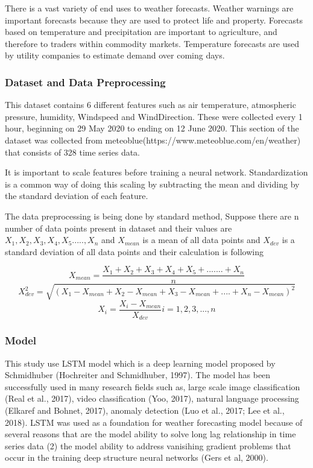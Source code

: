 There is a vast variety of end uses to weather forecasts. Weather warnings are important forecasts because they are used to protect life and property. Forecasts based on temperature and precipitation are important to agriculture, and therefore to traders within commodity markets. Temperature forecasts are used by utility companies to estimate demand over coming days.

\subsubsection{Dataset and Data Preprocessing}

This dataset contains 6 different features such as air temperature, atmospheric pressure, humidity, Windspeed and WindDirection. These were collected every 1 hour, beginning on 29 May 2020 to ending on 12 June 2020. This section of the dataset was collected from meteoblue(https://www.meteoblue.com/en/weather) that consists of 328 time series data. 

It is important to scale features before training a neural network. Standardization is a common way of doing this scaling by subtracting the mean and dividing by the standard deviation of each feature. 

The data preprocessing is being done by standard method,
Suppose there are n number of data points present in dataset and their values are $X_1, X_2, X_3, X_4, X_5 ....., X_n$ and $X_{mean}$ is a mean of all data points and $X_{dev}$ is a standard deviation of all data points and their calculation is following 

\[ X_{mean} = \dfrac{X_1 + X_2 + X_3 + X_4 + X_5 + ....... + X_n }{n} \]
\[X_{dev}^{2} = \sqrt{ ( X_1 -X_{mean} + X_2 -X_{mean} + X_3 -X_{mean} + .... + X_n -X_{mean} )^2}\]
\[ X_i = \dfrac{X_i - X_{mean}}{X_{dev}} i = 1, 2, 3, ..., n\]

\subsubsection{Model}
This study use LSTM model which is a deep
learning model proposed by Schmidhuber (Hochreiter
and Schmidhuber, 1997). The model has been
successfully used in many research fields such as,
large scale image classification (Real et al., 2017),
video classification (Yoo, 2017), natural language
processing (Elkaref and Bohnet, 2017), anomaly
detection (Luo et al., 2017; Lee et al., 2018). LSTM
was used as a foundation for weather forecasting
model because of several reasons that are the
model ability to solve long lag relationship in time
series data (2) the model ability to address vanisihing
gradient problems that occur in the training deep
structure neural networks (Gers et al, 2000). 

